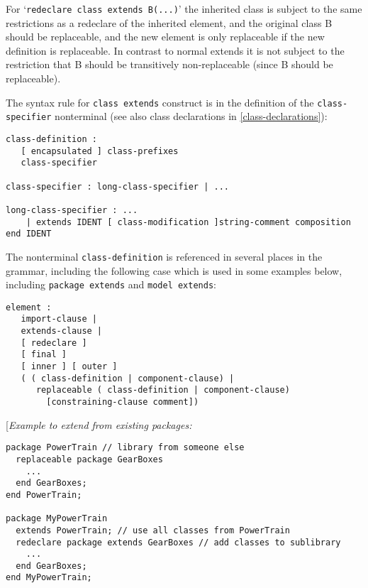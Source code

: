 For `\lstinline[basicstyle=\ttfamily]!redeclare class extends B(...)!' the inherited class is subject
to the same restrictions as a redeclare of the inherited element, and
the original class B should be replaceable, and the new element is only
replaceable if the new definition is replaceable. In contrast to normal
extends it is not subject to the restriction that B should be
transitively non-replaceable (since B should be replaceable).

The syntax rule for \lstinline[basicstyle=\ttfamily]!class extends! construct is in the definition of the
\lstinline[basicstyle=\ttfamily]!class-specifier! nonterminal (see also class declarations in \autoref{class-declarations}):

\begin{lstlisting}[language=grammar]
class-definition :
   [ encapsulated ] class-prefixes
   class-specifier

class-specifier : long-class-specifier | ...

long-class-specifier : ...
    | extends IDENT [ class-modification ]string-comment composition end IDENT
\end{lstlisting}
The nonterminal \lstinline[basicstyle=\ttfamily]!class-definition! is referenced in several places in the
grammar, including the following case which is used in some examples
below, including \lstinline[basicstyle=\ttfamily]!package extends! and \lstinline[basicstyle=\ttfamily]!model extends!:
\begin{lstlisting}[language=grammar]
element :
   import-clause |
   extends-clause |
   [ redeclare ]
   [ final ]
   [ inner ] [ outer ]
   ( ( class-definition | component-clause) |
      replaceable ( class-definition | component-clause)
        [constraining-clause comment])
\end{lstlisting}

{[}\emph{Example to extend from existing packages:}
\begin{lstlisting}[language=modelica]
package PowerTrain // library from someone else
  replaceable package GearBoxes
    ...
  end GearBoxes;
end PowerTrain;

package MyPowerTrain
  extends PowerTrain; // use all classes from PowerTrain
  redeclare package extends GearBoxes // add classes to sublibrary
    ...
  end GearBoxes;
end MyPowerTrain;
\end{lstlisting}

